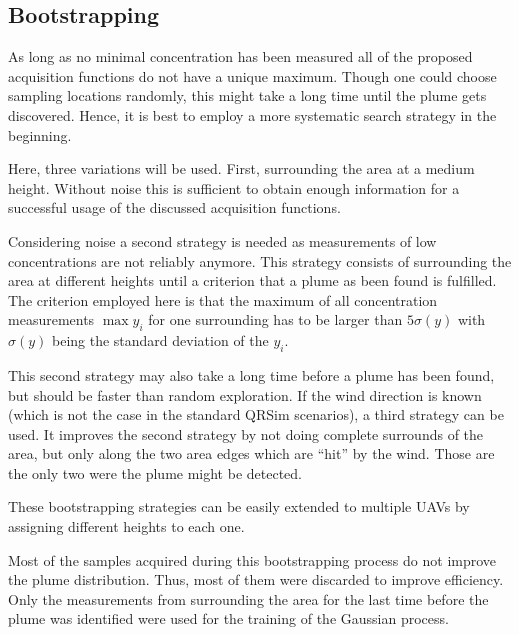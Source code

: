\subsection{Bootstrapping}
As long as no minimal concentration has been measured all of the proposed 
acquisition functions do not have a unique maximum. Though one could choose 
sampling locations randomly, this might take a long time until the plume gets 
discovered.  Hence, it is best to employ a more systematic search strategy in 
the beginning.

Here, three variations will be used. First, surrounding the area at a medium 
height.  Without noise this is sufficient to obtain enough information for 
a successful usage of the discussed acquisition functions.

Considering noise a second strategy is needed as measurements of low 
concentrations are not reliably anymore. This strategy consists of surrounding 
the area at different heights until a criterion that a plume as been found is 
fulfilled. The criterion employed here is that the maximum of all concentration 
measurements $\max y_i$ for one surrounding has to be larger than $5\sigma(y)$ 
with $\sigma(y)$ being the standard deviation of the $y_i$.

This second strategy may also take a long time before a plume has been found, 
but should be faster than random exploration. If the wind direction is known 
(which is not the case in the standard QRSim scenarios), a third strategy can be 
used.  It improves the second strategy by not doing complete surrounds of the 
area, but only along the two area edges which are ``hit'' by the wind. Those are 
the only two were the plume might be detected.

These bootstrapping strategies can be easily extended to multiple UAVs by 
assigning different heights to each one.

Most of the samples acquired during this bootstrapping process do not improve 
the plume distribution. Thus, most of them were discarded to improve efficiency.  
Only the measurements from surrounding the area for the last time before the 
plume was identified were used for the training of the Gaussian process.

